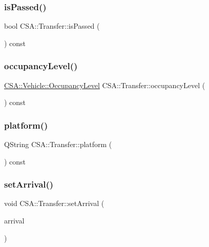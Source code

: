 \subsubsection{\texorpdfstring{is\+Passed()}{isPassed()}}
{\footnotesize\ttfamily bool C\+S\+A\+::\+Transfer\+::is\+Passed (\begin{DoxyParamCaption}{ }\end{DoxyParamCaption}) const}

\mbox{\label{classCSA_1_1Transfer_a7d5855f37a04c5e0dab60d87ef38f2ef}} 
\subsubsection{\texorpdfstring{occupancy\+Level()}{occupancyLevel()}}
{\footnotesize\ttfamily \mbox{\hyperlink{classCSA_1_1Vehicle_a331cc81107e5f0a8f37f894729dd9bda}{C\+S\+A\+::\+Vehicle\+::\+Occupancy\+Level}} C\+S\+A\+::\+Transfer\+::occupancy\+Level (\begin{DoxyParamCaption}{ }\end{DoxyParamCaption}) const}

\mbox{\label{classCSA_1_1Transfer_a6b3d8d41cbe77793366243ac6902766f}} 
\subsubsection{\texorpdfstring{platform()}{platform()}}
{\footnotesize\ttfamily Q\+String C\+S\+A\+::\+Transfer\+::platform (\begin{DoxyParamCaption}{ }\end{DoxyParamCaption}) const}

\mbox{\label{classCSA_1_1Transfer_a0d139f6475fc5d791cf24e964777d9a5}} 
\subsubsection{\texorpdfstring{set\+Arrival()}{setArrival()}}
{\footnotesize\ttfamily void C\+S\+A\+::\+Transfer\+::set\+Arrival (\begin{DoxyParamCaption}\item[{\mbox{\hyperlink{classCSA_1_1RouteLegEnd}{C\+S\+A\+::\+Route\+Leg\+End}} $\ast$}]{arrival }\end{DoxyParamCaption})}


